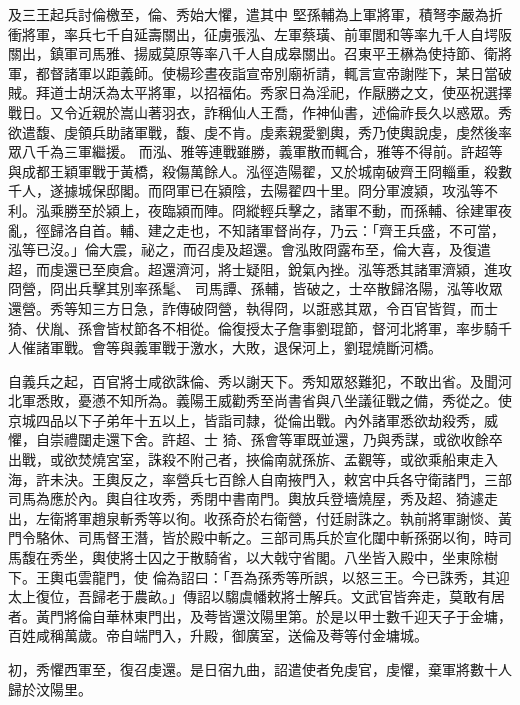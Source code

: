 \begin{pinyinscope}
 及三王起兵討倫檄至，倫、秀始大懼，遣其中
 堅孫輔為上軍將軍，積弩李嚴為折衝將軍，率兵七千自延壽關出，征虜張泓、左軍蔡璜、前軍閭和等率九千人自堮阪關出，鎮軍司馬雅、揚威莫原等率八千人自成皋關出。召東平王楙為使持節、衛將軍，都督諸軍以距義師。使楊珍晝夜詣宣帝別廟祈請，輒言宣帝謝陛下，某日當破賊。拜道士胡沃為太平將軍，以招福佑。秀家日為淫祀，作厭勝之文，使巫祝選擇戰日。又令近親於嵩山著羽衣，詐稱仙人王喬，作神仙書，述倫祚長久以惑眾。秀欲遣馥、虔領兵助諸軍戰，馥、虔不肯。虔素親愛劉輿，秀乃使輿說虔，虔然後率眾八千為三軍繼援。
 而泓、雅等連戰雖勝，義軍散而輒合，雅等不得前。許超等與成都王穎軍戰于黃橋，殺傷萬餘人。泓徑造陽翟，又於城南破齊王冏輜重，殺數千人，遂據城保邸閣。而冏軍已在潁陰，去陽翟四十里。冏分軍渡潁，攻泓等不利。泓乘勝至於潁上，夜臨潁而陣。冏縱輕兵擊之，諸軍不動，而孫輔、徐建軍夜亂，徑歸洛自首。輔、建之走也，不知諸軍督尚存，乃云：「齊王兵盛，不可當，泓等已沒。」倫大震，祕之，而召虔及超還。會泓敗冏露布至，倫大喜，及復遣超，而虔還已至庾倉。超還濟河，將士疑阻，銳氣內挫。泓等悉其諸軍濟潁，進攻冏營，冏出兵擊其別率孫髦、
 司馬譚、孫輔，皆破之，士卒散歸洛陽，泓等收眾還營。秀等知三方日急，詐傳破冏營，執得冏，以誑惑其眾，令百官皆賀，而士猗、伏胤、孫會皆杖節各不相從。倫復授太子詹事劉琨節，督河北將軍，率步騎千人催諸軍戰。會等與義軍戰于激水，大敗，退保河上，劉琨燒斷河橋。



 自義兵之起，百官將士咸欲誅倫、秀以謝天下。秀知眾怒難犯，不敢出省。及聞河北軍悉敗，憂懣不知所為。義陽王威勸秀至尚書省與八坐議征戰之備，秀從之。使京城四品以下子弟年十五以上，皆詣司隸，從倫出戰。內外諸軍悉欲劫殺秀，威懼，自崇禮闥走還下舍。許超、士
 猗、孫會等軍既並還，乃與秀謀，或欲收餘卒出戰，或欲焚燒宮室，誅殺不附己者，挾倫南就孫旂、孟觀等，或欲乘船東走入海，許未決。王輿反之，率營兵七百餘人自南掖門入，敕宮中兵各守衛諸門，三部司馬為應於內。輿自往攻秀，秀閉中書南門。輿放兵登墻燒屋，秀及超、猗遽走出，左衛將軍趙泉斬秀等以徇。收孫奇於右衛營，付廷尉誅之。執前將軍謝惔、黃門令駱休、司馬督王潛，皆於殿中斬之。三部司馬兵於宣化闥中斬孫弼以徇，時司馬馥在秀坐，輿使將士囚之于散騎省，以大戟守省閣。八坐皆入殿中，坐東除樹下。王輿屯雲龍門，使
 倫為詔曰：「吾為孫秀等所誤，以怒三王。今已誅秀，其迎太上復位，吾歸老于農畝。」傳詔以騶虞幡敕將士解兵。文武官皆奔走，莫敢有居者。黃門將倫自華林東門出，及荂皆還汶陽里第。於是以甲士數千迎天子于金墉，百姓咸稱萬歲。帝自端門入，升殿，御廣室，送倫及荂等付金墉城。



 初，秀懼西軍至，復召虔還。是日宿九曲，詔遣使者免虔官，虔懼，棄軍將數十人歸於汶陽里。




\end{pinyinscope}

